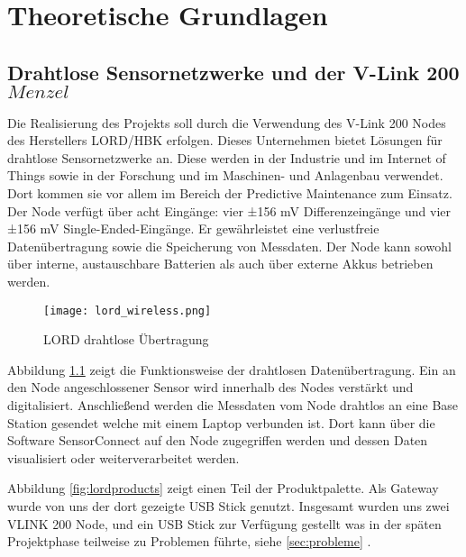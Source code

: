 \chapter{Theoretische Grundlagen}
\label{sec:theo}

\section{Drahtlose Sensornetzwerke und der V-Link 200 \(Menzel\)}

Die Realisierung des Projekts soll durch die Verwendung des V-Link 200 Nodes des Herstellers LORD/HBK erfolgen.
Dieses Unternehmen bietet Lösungen für drahtlose Sensornetzwerke an. Diese werden in der
Industrie und im Internet of Things sowie in der Forschung und im Maschinen- und Anlagenbau verwendet. Dort kommen sie vor allem im Bereich der Predictive Maintenance zum Einsatz.
Der Node verfügt über acht Eingänge: vier ±156 mV Differenzeingänge und vier ±156 mV Single-Ended-Eingänge. Er gewährleistet eine verlustfreie Datenübertragung sowie die Speicherung von Messdaten. Der Node kann sowohl über interne, austauschbare Batterien als auch über externe Akkus betrieben werden.

\begin{figure}[h]
    \begin{center}
        \texttt{[image: lord\_wireless.png]}
        \caption[LORD drahtlose Übertragung (Abbildungsverzeichnis)]{LORD drahtlose Übertragung
        \cite{VLInkManual}
        }
        \label{fig:lordwireless}
    \end{center}
\end{figure}

Abbildung \ref{fig:lordwireless} zeigt die Funktionsweise der drahtlosen Datenübertragung.
Ein an den Node angeschlossener Sensor wird innerhalb des Nodes verstärkt und digitalisiert.
Anschließend werden die Messdaten vom Node drahtlos an eine Base Station gesendet welche mit einem Laptop verbunden ist.
Dort kann über die Software SensorConnect auf den Node zugegriffen werden und dessen Daten visualisiert oder weiterverarbeitet werden.


Abbildung \ref{fig:lordproducts} zeigt einen Teil der Produktpalette.
Als Gateway wurde von uns der dort gezeigte USB Stick genutzt.
Insgesamt wurden uns zwei VLINK 200 Node, und ein USB Stick zur Verfügung gestellt was in der späten Projektphase teilweise zu Problemen führte,
siehe \ref{sec:probleme} .

